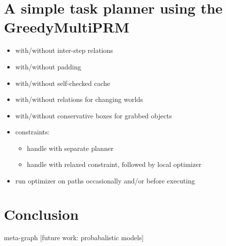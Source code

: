 \documentclass{article}
\begin{document}
\newpage
\section{A simple task planner using the GreedyMultiPRM}

\begin{itemize}
\item with/without inter-step relations
\item with/without padding
\item with/without self-checked cache
\item with/without relations for changing worlds
\item with/without conservative boxes for grabbed objects
\item constraints:
   \begin{itemize}
   \item handle with separate planner
   \item handle with relaxed constraint, followed by local optimizer
   \end{itemize}
\item run optimizer on paths occasionally and/or before executing
\end{itemize}


\newpage
\section{Conclusion}

meta-graph [future work: probabalistic models]


{\small


}
\end{document}
